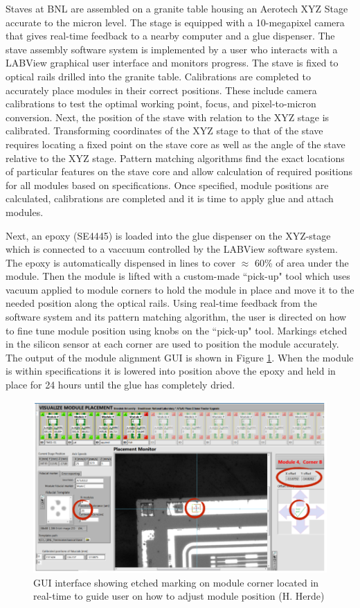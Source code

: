 Staves at BNL are assembled on a granite table housing an Aerotech XYZ Stage accurate to the micron level. The stage is equipped with a 10-megapixel camera that gives real-time feedback to a nearby computer and a glue dispenser. The stave assembly software system is implemented by a user who interacts with a LABView graphical user interface and monitors progress. The stave is fixed to optical rails drilled into the granite table. Calibrations are completed to accurately place modules in their correct positions. These include camera calibrations to test the optimal working point, focus, and pixel-to-micron conversion. Next, the position of the stave with relation to the XYZ stage is calibrated. Transforming coordinates of the XYZ stage to that of the stave requires locating a fixed point on the stave core as well as the angle of the stave relative to the XYZ stage. Pattern matching algorithms find the exact locations of particular features on the stave core and allow calculation of required positions for all modules based on specifications. Once specified, module positions are calculated, calibrations are completed and it is time to apply glue and attach modules. 

Next, an epoxy (SE4445) is loaded into the glue dispenser on the XYZ-stage which is connected to a vaccuum controlled by the LABView software system. The epoxy is automatically dispensed in lines to cover $\approx$ 60\% of area under the module. Then the module is lifted with a custom-made ``pick-up" tool which uses vacuum applied to module corners to hold the module in place and move it to the needed position along the optical rails. Using real-time feedback from the software system and its pattern matching algorithm, the user is directed on how to fine tune module position using knobs on the ``pick-up" tool. Markings etched in the silicon sensor at each corner are used to position the module accurately. The output of the module alignment GUI is shown in Figure \ref{fig:modulealignment}. When the module is within specifications it is lowered into position above the epoxy and held in place for 24 hours until the glue has completely dried.

\begin{figure}[!h]
        \centering
    \includegraphics[width=.6\textwidth]{Pictures/labviewscreen.png}
    \caption{GUI interface showing etched marking on module corner located in real-time to guide user on how to adjust module position (H. Herde)}
    \label{fig:modulealignment}
\end{figure}

